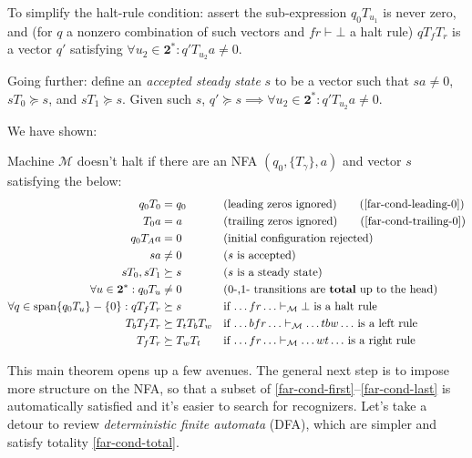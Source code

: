 To simplify the halt-rule condition:
assert the sub-expression $q_0 T_{u_1}$ is never zero,
and (for $q$ a nonzero combination of such vectors and $fr\vdash\bot$ a halt rule)
$q T_f T_r$ is a vector $q'$ satisfying $\forall u_2\in\mathbf{2}^*: q' T_{u_2} a\ne 0$.

Going further: define an \emph{accepted steady state} $s$ to be a vector such that $sa\ne 0$, $s T_0\succeq s$, and $s T_1\succeq s$.
Given such $s$, $q'\succeq s\implies \forall u_2\in\mathbf{2}^*: q'T_{u_2}a\ne 0$.

We have shown:

\begin{theorem}
  \label{far-main-theorem}
  Machine $\mathcal{M}$ doesn't halt if there are an NFA $(q_0, \{T_\gamma\}, a)$ and vector $s$ satisfying the below:
  \begin{align}
    \label{far-cond-first}
    q_0 T_0 &= q_0
    &&\text{(leading zeros ignored)}
    \tag{\ref{far-cond-leading-0}}
    \\
    T_0 a &= a
    &&\text{(trailing zeros ignored)}
    \tag{\ref{far-cond-trailing-0}}
    \\
    q_0 T_A a &= 0
    &&\text{(initial configuration rejected)}
    \label{far-cond-reject-start}
    \\
    sa &\ne 0
    &&\text{($s$ is accepted)}
    \label{far-cond-ass-accepted}
    \\
    sT_0,sT_1 &\succeq s
    &&\text{($s$ is a steady state)}
    \label{far-cond-ass-steady}
    \\
    \forall u\in\mathbf{2}^*: q_0 T_u &\ne 0
    &&\text{(0-,1- transitions are \textbf{total} up to the head)}
    \label{far-cond-total}
    \\
    \forall q\in\operatorname{span}\{q_0T_u\}-\{0\}: q T_f T_r &\succeq s
    &&\text{if $\ldots fr\ldots\vdash_\mathcal{M}\bot$ is a halt rule}
    \label{far-cond-halt}
    \\
    T_b T_f T_r &\succeq T_t T_b T_w
    &&\text{if $\ldots bfr\ldots\vdash_\mathcal{M}\ldots tbw\ldots$ is a left rule}
    \label{far-cond-left}
    \\
    T_f T_r &\succeq T_w T_t
    &&\text{if $\ldots fr\ldots\vdash_\mathcal{M}\ldots wt\ldots$ is a right rule}
    \label{far-cond-last}
  \end{align}
\end{theorem}

This main theorem opens up a few avenues.
The general next step is to impose more structure on the NFA, so that a subset of \eqref{far-cond-first}--\eqref{far-cond-last} is automatically satisfied and it's easier to search for recognizers.
Let's take a detour to review \emph{deterministic finite automata} (DFA), which are simpler and satisfy totality \eqref{far-cond-total}.


